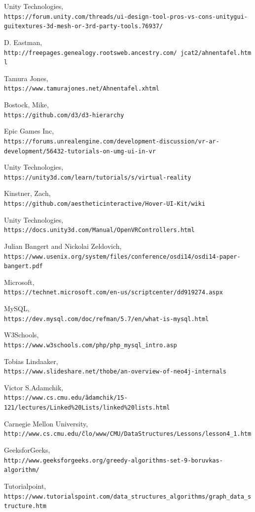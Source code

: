 \documentclass[onecolumn, draftclsnofoot,10pt, compsoc]{IEEEtran}
\begin{document}
\begin{thebibliography}{}
Unity Technologies,
\\\texttt{https://forum.unity.com/threads/ui-design-tool-pros-vs-cons-unitygui-guitextures-3d-mesh-or-3rd-party-tools.76937/}

D. Eastman,
\\\texttt{http://freepages.genealogy.rootsweb.ancestry.com/~jcat2/ahnentafel.html}

Tamura Jones,
\\\texttt{https://www.tamurajones.net/Ahnentafel.xhtml}

Bostock, Mike,
\\\texttt{https://github.com/d3/d3-hierarchy}

Epic Games Inc,
\\\texttt{https://forums.unrealengine.com/development-discussion/vr-ar-development/56432-tutorials-on-umg-ui-in-vr}

Unity Technologies,
\\\texttt{https://unity3d.com/learn/tutorials/s/virtual-reality}

Kinstner, Zach,
\\\texttt{https://github.com/aestheticinteractive/Hover-UI-Kit/wiki}

Unity Technologies,
\\\texttt{https://docs.unity3d.com/Manual/OpenVRControllers.html}


Julian Bangert and Nickolai Zeldovich, 
\\\texttt{https://www.usenix.org/system/files/conference/osdi14/osdi14-paper-bangert.pdf}


Microsoft,
\\\texttt{https://technet.microsoft.com/en-us/scriptcenter/dd919274.aspx}

MySQL,
\\\texttt{https://dev.mysql.com/doc/refman/5.7/en/what-is-mysql.html}

W3Schools,
\\\texttt{https://www.w3schools.com/php/php\_mysql\_intro.asp}

Tobias Lindaaker,
\\\texttt{https://www.slideshare.net/thobe/an-overview-of-neo4j-internals}

Victor S.Adamchik,
\\\texttt{https://www.cs.cmu.edu/\~adamchik/15-121/lectures/Linked\%20Lists/linked\%20lists.html}

Carnegie Mellon University,
\\\texttt{http://www.cs.cmu.edu/\~clo/www/CMU/DataStructures/Lessons/lesson4\_1.htm}

GeeksforGeeks,
\\\texttt{http://www.geeksforgeeks.org/greedy-algorithms-set-9-boruvkas-algorithm/}

Tutorialpoint,
\\\texttt{https://www.tutorialspoint.com/data\_structures\_algorithms/graph\_data\_structure.htm}

\end{thebibliography}
\end{document}
